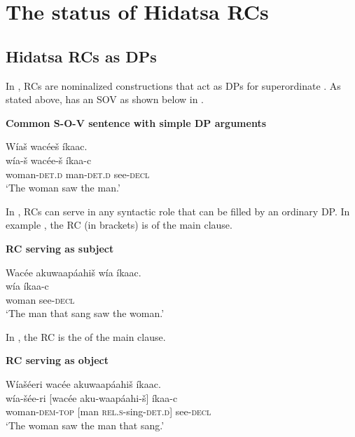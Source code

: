 \documentclass[output=paper]{LSP/langsci}
\begin{document}
\section{The status of {Hidatsa} RCs}\label{sec:boyle:2}

\subsection{{Hidatsa} RCs as DPs}\label{sec:boyle:2.1}

In , RCs are nominalized constructions that act as DPs for superordinate . As stated above,  has an SOV  as shown below in .

\ea \textbf{Common S-O-V sentence with simple DP arguments} \label{boyle1}

\glll W\'ia\v{s} wacée\v{s} \'ikaac.\\
w\'ia-\v{s}  wacée-\v{s} \'ikaa-c\\
woman-\textsc{det.d} man-\textsc{det.d} see-\textsc{decl}\\
\trans`The woman saw the man.' 
\z

In , RCs can serve in any syntactic role that can be filled by an ordinary DP. In example , the RC (in brackets) is  of the main clause.  
\newpage 

\ea \textbf{RC serving as subject} \label{boyle2}

\glll {\ob}Wacée akuwaapáahi\v{s}{\cb}  w\'ia \'ikaac.\\	
[wacée aku-waapáahi-\v{s}] w\'ia  \'ikaa-c\\
[man \textsc{rel.s}-sing-\textsc{det.d}] woman see-\textsc{decl}\\
\trans`The man that sang saw the woman.' 
\z

In , the RC is the  of the main clause.

\ea \textbf{RC serving as object} \label{boyle3}

\glll W\'ia\v{s}éeri  {\ob}wacée akuwaapáahi\v{s}{\cb}  \'ikaac.\\
w\'ia-\v{s}ée-ri  [wacée aku-waapáahi-\v{s}] \'ikaa-c\\
woman-\textsc{dem-top} [man \textsc{rel.s}-sing-\textsc{det.d}] see-\textsc{decl}\\
\trans `The woman saw the man that sang.' 
\z
\end{document}
